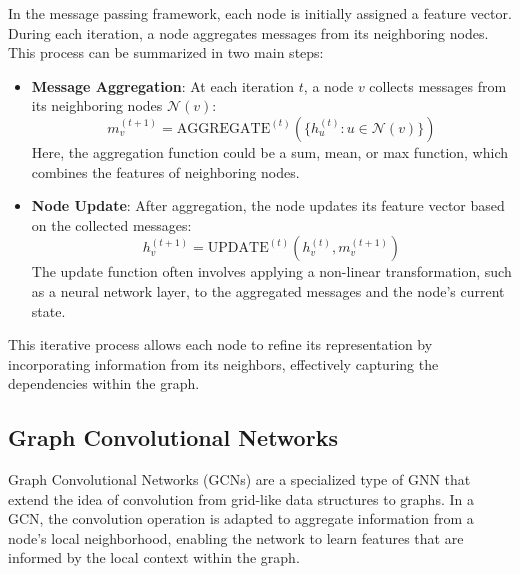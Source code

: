 In the message passing framework, each node is initially assigned a feature
vector. During each iteration, a node aggregates messages from its neighboring
nodes. This process can be summarized in two main steps:
\begin{itemize}
  \item \textbf{Message Aggregation}: At each iteration \( t \), a node \( v \)
  collects messages from its neighboring nodes \( \mathcal{N}(v) \):
  \begin{equation}
    m_v^{(t+1)} = \mathrm{AGGREGATE}^{(t)} \left( \{ h_u^{(t)} : u \in \mathcal{N}(v) \} \right)
  \end{equation}
  Here, the aggregation function could be a sum, mean, or max function, which
  combines the features of neighboring nodes.
  \item \textbf{Node Update}: After aggregation, the node updates its feature
  vector based on the collected messages:
  \begin{equation}
    h_v^{(t+1)} = \mathrm{UPDATE}^{(t)}(h_v^{(t)}, m_v^{(t+1)})
  \end{equation}
  The update function often involves applying a non-linear transformation, such
  as a neural network layer, to the aggregated messages and the node's current
  state.
\end{itemize}
This iterative process allows each node to refine its representation by
incorporating information from its neighbors, effectively capturing the
dependencies within the graph.

\subsection{Graph Convolutional Networks}
Graph Convolutional Networks (GCNs) \cite{kipf2016semi} are a specialized type
of GNN that extend the idea of convolution from grid-like data structures to
graphs. In a GCN, the convolution operation is adapted to aggregate information
from a node's local neighborhood, enabling the network to learn features that
are informed by the local context within the graph.

